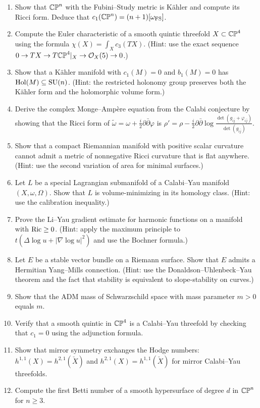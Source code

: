 \begin{enumerate}
    \item [B] Show that $\mathbb{CP}^n$ with the Fubini--Study metric is K\"ahler and compute its Ricci form. Deduce that $c_1(\mathbb{CP}^n) = (n+1)[\omega_{\mathrm{FS}}]$.
    \item [B] Compute the Euler characteristic of a smooth quintic threefold $X \subset \mathbb{CP}^4$ using the formula $\chi(X) = \int_X c_3(TX)$. (Hint: use the exact sequence $0 \to TX \to T\mathbb{CP}^4|_X \to \mathcal{O}_X(5) \to 0$.)
    \item [I] Show that a K\"ahler manifold with $c_1(M) = 0$ and $b_1(M) = 0$ has $\operatorname{Hol}(M) \subseteq \operatorname{SU}(n)$. (Hint: the restricted holonomy group preserves both the K\"ahler form and the holomorphic volume form.)
    \item [I] Derive the complex Monge--Amp\`ere equation from the Calabi conjecture by showing that the Ricci form of $\tilde\omega = \omega + \frac{i}{2}\partial\bar\partial\varphi$ is $\rho' = \rho - \frac{i}{2}\partial\bar\partial\log\frac{\det(g_{i\bar j} + \varphi_{i\bar j})}{\det(g_{i\bar j})}$.
    \item [I] Show that a compact Riemannian manifold with positive scalar curvature cannot admit a metric of nonnegative Ricci curvature that is flat anywhere. (Hint: use the second variation of area for minimal surfaces.)
    \item [I] Let $L$ be a special Lagrangian submanifold of a Calabi--Yau manifold $(X, \omega, \Omega)$. Show that $L$ is volume-minimizing in its homology class. (Hint: use the calibration inequality.)
    \item [A] Prove the Li--Yau gradient estimate for harmonic functions on a manifold with $\operatorname{Ric} \geq 0$. (Hint: apply the maximum principle to $t(\Delta \log u + |\nabla \log u|^2)$ and use the Bochner formula.)
    \item [A] Let $E$ be a stable vector bundle on a Riemann surface. Show that $E$ admits a Hermitian Yang--Mills connection. (Hint: use the Donaldson--Uhlenbeck--Yau theorem and the fact that stability is equivalent to slope-stability on curves.)
    \item [I] Show that the ADM mass of Schwarzschild space with mass parameter $m > 0$ equals $m$.
    \item [B] Verify that a smooth quintic in $\mathbb{CP}^4$ is a Calabi--Yau threefold by checking that $c_1 = 0$ using the adjunction formula.
    \item [I] Show that mirror symmetry exchanges the Hodge numbers: $h^{1,1}(X) = h^{2,1}(\check X)$ and $h^{2,1}(X) = h^{1,1}(\check X)$ for mirror Calabi--Yau threefolds.
    \item [B] Compute the first Betti number of a smooth hypersurface of degree $d$ in $\mathbb{CP}^n$ for $n \geq 3$.
\end{enumerate}

